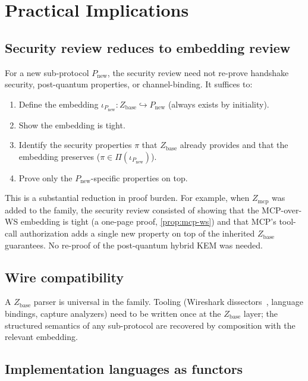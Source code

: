 \documentclass[11pt]{article}
\theoremstyle{definition}
\theoremstyle{remark}
\newcommand{\Zb}{Z_{\mathrm{base}}}
\newcommand{\Zm}{Z_{\mathrm{mcp}}}
\begin{document}
\section{Practical Implications}
\label{sec:practice}

\subsection{Security review reduces to embedding review}

For a new sub-protocol $P_{\mathrm{new}}$, the security review need
not re-prove handshake security, post-quantum properties, or
channel-binding. It suffices to:

\begin{enumerate}
\item Define the embedding $\iota_{P_{\mathrm{new}}} : \Zb
\hookrightarrow P_{\mathrm{new}}$ (always exists by initiality).
\item Show the embedding is tight.
\item Identify the security properties $\pi$ that $\Zb$ already
provides and that the embedding preserves
($\pi \in \Pi(\iota_{P_{\mathrm{new}}})$).
\item Prove only the $P_{\mathrm{new}}$-specific properties on top.
\end{enumerate}

This is a substantial reduction in proof burden. For example, when
$\Zm$ was added to the family, the security review consisted of
showing that the MCP-over-WS embedding is tight (a one-page proof,
\cref{prop:mcp-ws}) and that MCP's tool-call authorization adds a
single new property on top of the inherited $\Zb$ guarantees. No
re-proof of the post-quantum hybrid KEM was needed.

\subsection{Wire compatibility}

A $\Zb$ parser is universal in the family. Tooling (Wireshark
dissectors~\cite{zap2026wire}, language bindings, capture analyzers)
need to be written once at the $\Zb$ layer; the structured semantics
of any sub-protocol are recovered by composition with the relevant
embedding.

\subsection{Implementation languages as functors}
\end{document}
